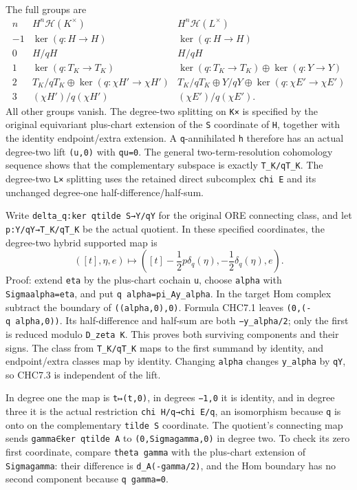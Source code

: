 The full groups are \[
\begin{array}{c|cc}
n&H^n\mathscr H(K^\times)&H^n\mathscr H(L^\times)\\\hline
-1&\ker(q:H\to H)&\ker(q:H\to H)\\
0&H/qH&H/qH\\
1&\ker(q:T_K\to T_K)&\ker(q:T_K\to T_K)\oplus\ker(q:Y\to Y)\\
2&T_K/qT_K\oplus\ker(q:\chi H'\to\chi H')
&T_K/qT_K\oplus Y/qY\oplus\ker(q:\chi E'\to\chi E')\\
3&(\chi H')/q(\chi H')&(\chi E')/q(\chi E').
\end{array}
\tag{CHC7.2}
\] All other groups vanish. The degree-two splitting on \texttt{K×} is
specified by the original equivariant plus-chart extension of the
\texttt{S\textquotesingle{}} coordinate of \texttt{H\textquotesingle{}},
together with the identity endpoint/extra extension. A
\texttt{q}-annihilated \texttt{h\textquotesingle{}} therefore has an
actual degree-two lift \texttt{(u,0)} with \texttt{qu=0}. The general
two-term-resolution cohomology sequence shows that the complementary
subspace is exactly \texttt{T\_K/qT\_K}. The degree-two \texttt{L×}
splitting uses the retained direct subcomplex
\texttt{chi\ E\textquotesingle{}} and its unchanged degree-one
half-difference/half-sum.

Write \texttt{delta\_q:ker\ q\textbar{}tilde\ S→Y/qY} for the original
ORE connecting class, and let \texttt{p:Y/qY→T\_K/qT\_K} be the actual
quotient. In these specified coordinates, the degree-two hybrid
supported map is \[
([t],\eta,e)\longmapsto
\left([t]-\frac12p\delta_q(\eta),
-\frac12\delta_q(\eta),e\right).
\tag{CHC7.3}
\] Proof: extend \texttt{eta} by the plus-chart cochain \texttt{u},
choose \texttt{alpha} with \texttt{Sigma\textquotesingle{}alpha=eta},
and put \texttt{q\ alpha=pi\_A\textquotesingle{}y\_alpha}. In the target
Hom complex subtract the boundary of \texttt{((alpha,0),0)}. Formula
CHC7.1 leaves \texttt{(0,(-q\ alpha,0))}. Its half-difference and
half-sum are both \texttt{−y\_alpha/2}; only the first is reduced modulo
\texttt{D\_zeta\ K}. This proves both surviving components and their
signs. The class from \texttt{T\_K/qT\_K} maps to the first summand by
identity, and endpoint/extra classes map by identity. Changing
\texttt{alpha} changes \texttt{y\_alpha} by \texttt{qY}, so CHC7.3 is
independent of the lift.

In degree one the map is \texttt{t↦(t,0)}, in degrees \texttt{−1,0} it
is identity, and in degree three it is the actual restriction
\texttt{chi\ H\textquotesingle{}/q→chi\ E\textquotesingle{}/q}, an
isomorphism because \texttt{q} is onto on the complementary
\texttt{tilde\ S} coordinate. The quotient's connecting map sends
\texttt{gamma∈ker\ q\textbar{}tilde\ A} to
\texttt{(0,Sigma\textquotesingle{}gamma,0)} in degree two. To check its
zero first coordinate, compare \texttt{theta\ gamma} with the plus-chart
extension of \texttt{Sigma\textquotesingle{}gamma}: their difference is
\texttt{d\_A\textquotesingle{}(-gamma/2)}, and the Hom boundary has no
second component because \texttt{q\ gamma=0}.

